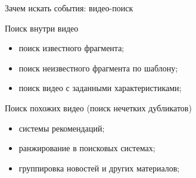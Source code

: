 
\begin{frame}{Зачем искать события: видео-поиск}
    \begin{grass-green-box}{Поиск внутри видео}
        \begin{itemize}
            \item поиск известного фрагмента;
            \item поиск неизвестного фрагмента по шаблону;
            \item поиск видео с заданными характеристиками;
        \end{itemize}
    \end{grass-green-box}
    \vspace{1.5em}
    \begin{gray-box}{Поиск похожих видео (поиск нечетких дубликатов)}
        \begin{itemize}
            \item системы рекомендаций;
            \item ранжирование в поисковых системах;
            \item группировка новостей и других материалов;
        \end{itemize}
    \end{gray-box}
\end{frame}




